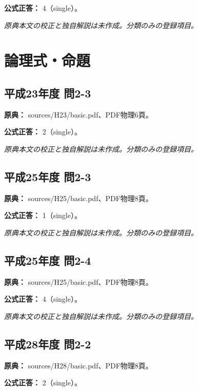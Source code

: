 \textbf{公式正答：} 4（single）。

\par\textit{原典本文の校正と独自解説は未作成。分類のみの登録項目。}

\section{論理式・命題}

\subsection{平成23年度 問2-3}
\label{q:h23-reg-basic-2-3}

\noindent\textbf{原典：} sources/H23/basic.pdf、PDF物理6頁。

\textbf{公式正答：} 2（single）。

\par\textit{原典本文の校正と独自解説は未作成。分類のみの登録項目。}

\subsection{平成25年度 問2-3}
\label{q:h25-reg-basic-2-3}

\noindent\textbf{原典：} sources/H25/basic.pdf、PDF物理8頁。

\textbf{公式正答：} 1（single）。

\par\textit{原典本文の校正と独自解説は未作成。分類のみの登録項目。}

\subsection{平成25年度 問2-4}
\label{q:h25-reg-basic-2-4}

\noindent\textbf{原典：} sources/H25/basic.pdf、PDF物理8頁。

\textbf{公式正答：} 4（single）。

\par\textit{原典本文の校正と独自解説は未作成。分類のみの登録項目。}

\subsection{平成28年度 問2-2}
\label{q:h28-reg-basic-2-2}

\noindent\textbf{原典：} sources/H28/basic.pdf、PDF物理8頁。

\textbf{公式正答：} 2（single）。

